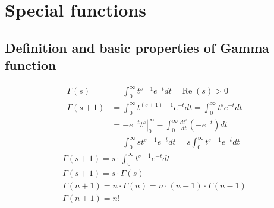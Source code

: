 

	\section{Special functions}
	\subsection{Definition and basic properties of Gamma function}
	$$
	\begin{aligned}
		\Gamma(s) &=\int_0^{\infty} t^{s-1} e^{-t} d t \quad \operatorname{Re}(s)>0 \\
		\Gamma(s+1) &=\int_0^{\infty} t^{(s+1)-1} e^{-t} d t=\int_0^{\infty} t^s e^{-t} d t \\
		&=-\left.e^{-t} t^s\right|_0 ^{\infty}-\int_0^{\infty} \frac{d t^s}{d t}\left(-e^{-t}\right) d t \\
		&=\int_0^{\infty} s t^{s-1} e^{-t} d t=s \int_0^{\infty} t^{s-1} e^{-t} d t
	\end{aligned}
	$$
	$$
	\begin{gathered}
		\Gamma(s+1)=s \cdot \int_0^{\infty} t^{s-1} e^{-t} d t \\
		\Gamma(s+1)=s \cdot \Gamma(s) \\
		\Gamma(n+1)=n \cdot \Gamma(n)=n \cdot(n-1) \cdot \Gamma(n-1) \\
		\Gamma(n+1)=n !
	\end{gathered}
	$$
